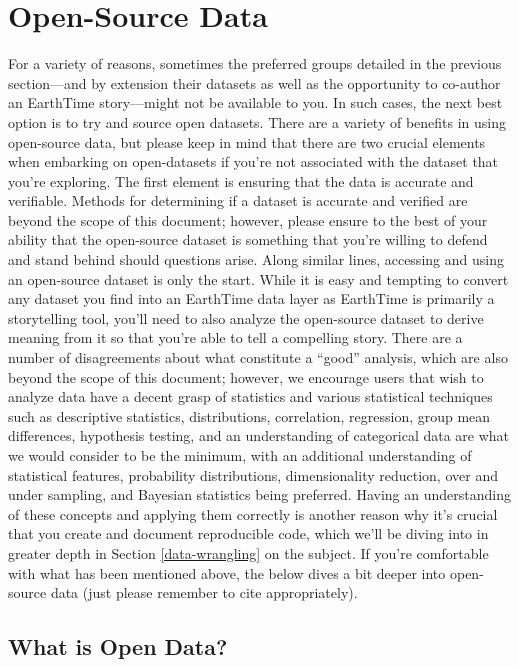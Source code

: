 \documentclass[
]{book}
\begin{document}
\hypertarget{open-source-data}{%
\section{Open-Source Data}\label{open-source-data}}

For a variety of reasons, sometimes the preferred groups detailed in the previous section---and by extension their datasets as well as the opportunity to co-author an EarthTime story---might not be available to you. In such cases, the next best option is to try and source open datasets. There are a variety of benefits in using open-source data, but please keep in mind that there are two crucial elements when embarking on open-datasets if you're not associated with the dataset that you're exploring. The first element is ensuring that the data is accurate and verifiable. Methods for determining if a dataset is accurate and verified are beyond the scope of this document; however, please ensure to the best of your ability that the open-source dataset is something that you're willing to defend and stand behind should questions arise. Along similar lines, accessing and using an open-source dataset is only the start. While it is easy and tempting to convert any dataset you find into an EarthTime data layer as EarthTime is primarily a storytelling tool, you'll need to also analyze the open-source dataset to derive meaning from it so that you're able to tell a compelling story. There are a number of disagreements about what constitute a ``good'' analysis, which are also beyond the scope of this document; however, we encourage users that wish to analyze data have a decent grasp of statistics and various statistical techniques such as descriptive statistics, distributions, correlation, regression, group mean differences, hypothesis testing, and an understanding of categorical data are what we would consider to be the minimum, with an additional understanding of statistical features, probability distributions, dimensionality reduction, over and under sampling, and Bayesian statistics being preferred. Having an understanding of these concepts and applying them correctly is another reason why it's crucial that you create and document reproducible code, which we'll be diving into in greater depth in Section \ref{data-wrangling} on the subject. If you're comfortable with what has been mentioned above, the below dives a bit deeper into open-source data (just please remember to cite appropriately).

\hypertarget{what-is-open-data}{%
\subsection*{What is Open Data?}\label{what-is-open-data}}
\end{document}
